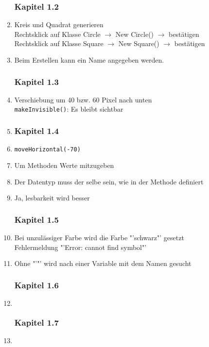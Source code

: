 \begin{enumerate}
\subsubsection{Kapitel 1.2}
\item Kreis und Quadrat generieren \\
      Rechtsklick auf Klasse Circle $\rightarrow$ New Circle() $\rightarrow$ bestätigen\\
      Rechtsklick auf Klasse Square $\rightarrow$ New Square() $\rightarrow$ bestätigen
\item Beim Erstellen kann ein Name angegeben werden. 

\subsubsection{Kapitel 1.3}
\item Verschiebung um 40 bzw. 60 Pixel nach unten \\
      \verb?makeInvisible()?: Es bleibt sichtbar
\item 

\subsubsection{Kapitel 1.4}
\item \verb?moveHorizontal(-70)?
\item Um Methoden Werte mitzugeben
\item Der Datentyp muss der selbe sein, wie in der Methode definiert
\item Ja, lesbarkeit wird besser

\subsubsection{Kapitel 1.5}
\item Bei unzulässiger Farbe wird die Farbe "'schwarz"' gesetzt\\
      Fehlermeldung "'Error: cannot find symbol"'
\item Ohne "'"' wird nach einer Variable mit dem Namen gesucht

\subsubsection{Kapitel 1.6}
\item $~$

\subsubsection{Kapitel 1.7}
\item $~$


\end{enumerate}
